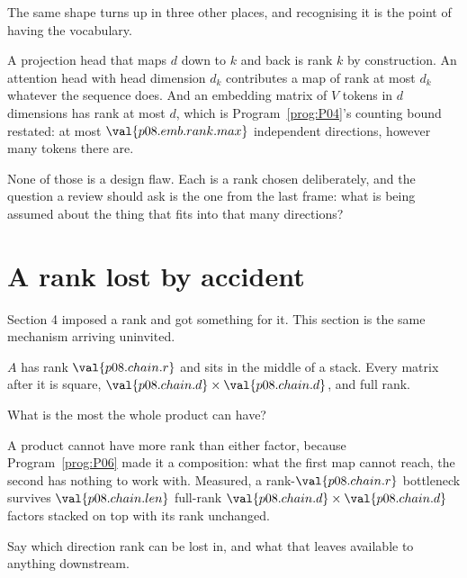 \begin{fr}
\begin{aibox}
The same shape turns up in three other places, and recognising it is the point
of having the vocabulary.

A projection head that maps $d$ down to $k$ and back is rank $k$ by
construction. An attention head with head dimension $d_k$ contributes a map of
rank at most $d_k$ whatever the sequence does. And an embedding matrix of
$V$ tokens in $d$ dimensions has rank at most $d$, which is
Program~\ref{prog:P04}'s counting bound restated: at most
$\val{p08.emb.rank.max}$ independent directions, however many tokens there are.

None of those is a design flaw. Each is a rank chosen deliberately, and the
question a review should ask is the one from the last frame: what is being
assumed about the thing that fits into that many directions?
\end{aibox}
\end{fr}

\section{A rank lost by accident}
\label{sec:P08-collapse}

\begin{fr}
Section 4 imposed a rank and got something for it. This section is the same
mechanism arriving uninvited.

$A$ has rank $\val{p08.chain.r}$ and sits in the middle of a stack. Every
matrix after it is square, $\val{p08.chain.d} \times \val{p08.chain.d}$, and
full rank.

What is the most the whole product can have?
\dotline
\nextframe
\end{fr}

\begin{fr}
A product cannot have more rank than either factor, because
Program~\ref{prog:P06} made it a composition: what the first map cannot reach,
the second has nothing to work with. Measured, a rank-$\val{p08.chain.r}$
bottleneck survives $\val{p08.chain.len}$ full-rank
$\val{p08.chain.d} \times \val{p08.chain.d}$ factors stacked on top with its
rank unchanged.

Say which direction rank can be lost in, and what that leaves available to
anything downstream.
\dotline
\nextframe
\end{fr}

